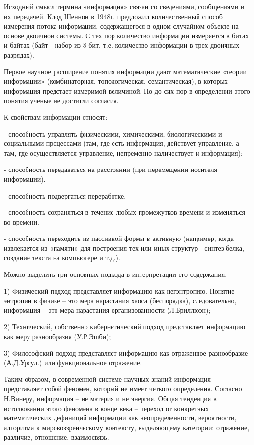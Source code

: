 \documentclass[exam_answers.tex]{subfiles}
\begin{document}
Исходный смысл термина «информация» связан со сведениями, сообщениями и
их передачей. Клод Шеннон в 1948г. предложил количественный способ
измерения потока информации, содержащегося в одном случайном объекте на
основе двоичной системы. С тех пор количество информации измеряется в
битах и байтах (байт - набор из 8 бит, т.е. количество информации в трех
двоичных разрядах).

Первое научное расширение понятия информации дают математические
«теории информации» (комбинаторная, топологическая, семантическая), в которых
информация предстает измеримой величиной. Но до сих пор в определении этого
понятия ученые не достигли согласия.

К свойствам информации относят:

- способность управлять физическими, химическими, биологическими и
социальными процессами (там, где есть информация, действует управление, а там,
где осуществляется управление, непременно наличествует и информация);

- способность передаваться на расстоянии (при перемещении носителя
информации).

- способность подвергаться переработке.

- способность сохраняться в течение любых промежутков времени и
изменяться во времени.

- способность переходить из пассивной формы в активную (например, когда
извлекается из «памяти» для построения тех или иных структур - синтез белка,
создание текста на компьютере и т.д.).

Можно выделить три основных подхода в интерпретации его содержания.

1) Физический подход представляет информацию как негэнтропию.
Понятие энтропии в физике – это мера нарастания хаоса (беспорядка),
следовательно, информация – это мера нарастания организованности
(Л.Бриллюэн);

2) Технический, собственно кибернетический подход представляет
информацию как меру разнообразия (У.Р.Эшби);

3) Философский подход представляет информацию как отраженное
разнообразие (А.Д.Урсул.) или функциональное отражение.

Таким образом, в современной системе научных знаний информация
представляет собой феномен, который не имеет четкого определения. Согласно
Н.Винеру, информация – не материя и не энергия. Общая тенденция в истолковании
этого феномена в конце века – переход от конкретных математических дефиниций
информации как неопределенности, вероятности, алгоритма к мировоззренческому
контексту, выделяющему категории: отражение, различие, отношение, взаимосвязь.
\end{document}
